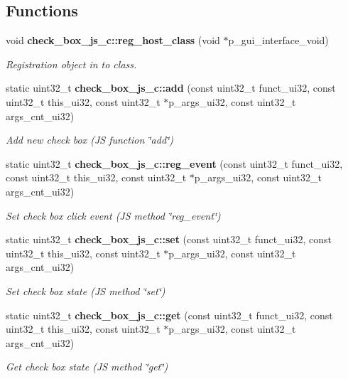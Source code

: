\subsection*{Functions}
\begin{DoxyCompactItemize}
\item 
void \textbf{ check\+\_\+box\+\_\+js\+\_\+c\+::reg\+\_\+host\+\_\+class} (void $\ast$p\+\_\+gui\+\_\+interface\+\_\+void)
\begin{DoxyCompactList}\small\item\em Registration object in to class. \end{DoxyCompactList}\item 
static uint32\+\_\+t \textbf{ check\+\_\+box\+\_\+js\+\_\+c\+::add} (const uint32\+\_\+t funct\+\_\+ui32, const uint32\+\_\+t this\+\_\+ui32, const uint32\+\_\+t $\ast$p\+\_\+args\+\_\+ui32, const uint32\+\_\+t args\+\_\+cnt\+\_\+ui32)
\begin{DoxyCompactList}\small\item\em Add new check box (JS function \char`\"{}add\char`\"{}) \end{DoxyCompactList}\item 
static uint32\+\_\+t \textbf{ check\+\_\+box\+\_\+js\+\_\+c\+::reg\+\_\+event} (const uint32\+\_\+t funct\+\_\+ui32, const uint32\+\_\+t this\+\_\+ui32, const uint32\+\_\+t $\ast$p\+\_\+args\+\_\+ui32, const uint32\+\_\+t args\+\_\+cnt\+\_\+ui32)
\begin{DoxyCompactList}\small\item\em Set check box click event (JS method \char`\"{}reg\+\_\+event\char`\"{}) \end{DoxyCompactList}\item 
static uint32\+\_\+t \textbf{ check\+\_\+box\+\_\+js\+\_\+c\+::set} (const uint32\+\_\+t funct\+\_\+ui32, const uint32\+\_\+t this\+\_\+ui32, const uint32\+\_\+t $\ast$p\+\_\+args\+\_\+ui32, const uint32\+\_\+t args\+\_\+cnt\+\_\+ui32)
\begin{DoxyCompactList}\small\item\em Set check box state (JS method \char`\"{}set\char`\"{}) \end{DoxyCompactList}\item 
static uint32\+\_\+t \textbf{ check\+\_\+box\+\_\+js\+\_\+c\+::get} (const uint32\+\_\+t funct\+\_\+ui32, const uint32\+\_\+t this\+\_\+ui32, const uint32\+\_\+t $\ast$p\+\_\+args\+\_\+ui32, const uint32\+\_\+t args\+\_\+cnt\+\_\+ui32)
\begin{DoxyCompactList}\small\item\em Get check box state (JS method \char`\"{}get\char`\"{}) \end{DoxyCompactList}\item 

\end{DoxyCompactItemize}
